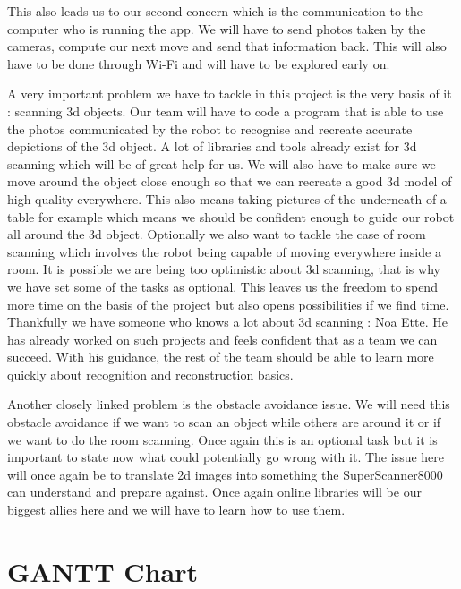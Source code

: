 \documentclass{article}
\begin{document}
This also leads us to our second concern which is the communication to the computer who is running the app. We will have to send photos taken by the cameras, compute our next move and send that information back. This will also have to be done through Wi-Fi and will have to be explored early on.

A very important problem we have to tackle in this project is the very basis of it : scanning 3d objects. Our team will have to code a program that is able to use the photos communicated by the robot to recognise and recreate accurate depictions of the 3d object. A lot of libraries and tools already exist for 3d scanning which will be of great help for us. We will also have to make sure we move around the object close enough so that we can recreate a good 3d model of high quality everywhere. This also means taking pictures of the underneath of a table for example which means we should be confident enough to guide our robot all around the 3d object. Optionally we also want to tackle the case of room scanning which involves the robot being capable of moving everywhere inside a room. It is possible we are being too optimistic about 3d scanning, that is why we have set some of the tasks as optional. This leaves us the freedom to spend more time on the basis of the project but also opens possibilities if we find time. Thankfully we have someone who knows a lot about 3d scanning : Noa Ette. He has already worked on such projects and feels confident that as a team we can succeed. With his guidance, the rest of the team should be able to learn more quickly about recognition and reconstruction basics.

Another closely linked problem is the obstacle avoidance issue. We will need this obstacle avoidance if we want to scan an object while others are around it or if we want to do the room scanning. Once again this is an optional task but it is important to state now what could potentially go wrong with it. The issue here will once again be to translate 2d images into something the SuperScanner8000 can understand and prepare against. Once again online libraries will be our biggest allies here and we will have to learn how to use them.

\section{GANTT Chart}
\end{document}
